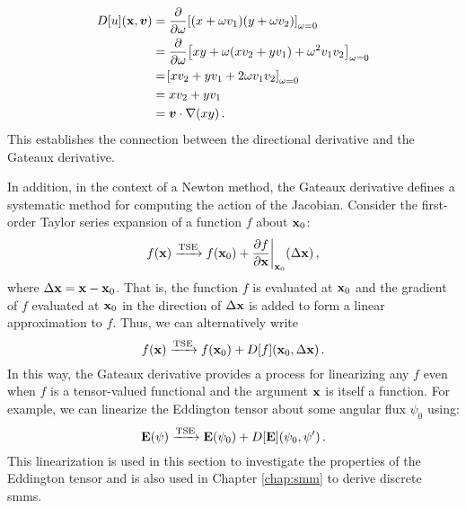 \documentclass[../doc.tex]{subfiles}
\begin{document}
	\begin{equation}
	\begin{aligned}
		D[u](\boldsymbol{\mathrm{x}},\boldsymbol{v}) &= \frac{\partial }{\partial \omega}\!\left[ (x+\omega v_1)(y + \omega v_2) \right]_{\omega = 0} \\
		&= \frac{\partial }{\partial \omega}\!\left[ xy + \omega(xv_2 + yv_1) + \omega^2 v_1 v_2 \right]_{\omega = 0} \\
		&= \!\left[ xv_2 + yv_1 + 2\omega v_1 v_2 \right]_{\omega = 0} \\
		&= x v_2 + y v_1 \\ 
		&= \boldsymbol{v} \cdot \nabla (xy) \,. 
	\end{aligned}
	\end{equation}
This establishes the connection between the directional derivative and the Gateaux derivative. 

In addition, in the context of a Newton method, the Gateaux derivative defines a systematic method for computing the action of the Jacobian. Consider the first-order Taylor series expansion of a function $f$ about $\boldsymbol{\mathrm{x}}_0$: 
	\begin{equation}
		f(\boldsymbol{\mathrm{x}}) \xrightarrow{\text{TSE}} f(\boldsymbol{\mathrm{x}}_0) + \frac{\partial f}{\partial \boldsymbol{\mathrm{x}}}\biggr\rvert_{\boldsymbol{\mathrm{x}}_0}(\Delta \boldsymbol{\mathrm{x}}) \,,
	\end{equation}
where $\Delta \boldsymbol{\mathrm{x}} = \boldsymbol{\mathrm{x}} - \boldsymbol{\mathrm{x}}_0$. That is, the function $f$ is evaluated at $\boldsymbol{\mathrm{x}}_0$ and the gradient of $f$ evaluated at $\boldsymbol{\mathrm{x}}_0$ in the direction of $\Delta\boldsymbol{\mathrm{x}}$ is added to form a linear approximation to $f$. Thus, we can alternatively write 
	\begin{equation}
		f(\boldsymbol{\mathrm{x}}) \xrightarrow{\text{TSE}} f(\boldsymbol{\mathrm{x}}_0) + D[f](\boldsymbol{\mathrm{x}}_0, \Delta \boldsymbol{\mathrm{x}}) \,. 
	\end{equation}
In this way, the Gateaux derivative provides a process for linearizing any $f$ even when $f$ is a tensor-valued functional and the argument $\boldsymbol{\mathrm{x}}$ is itself a function. For example, we can linearize the Eddington tensor about some angular flux $\psi_0$ using: 
	\begin{equation}
		\boldsymbol{\mathrm{E}}(\psi) \xrightarrow{\text{TSE}} \boldsymbol{\mathrm{E}}(\psi_0) + D[\boldsymbol{\mathrm{E}}](\psi_0,\psi') \,. 
	\end{equation}
This linearization is used in this section to investigate the properties of the Eddington tensor and is also used in Chapter \ref{chap:smm} to derive discrete \glspl{smm}. 
\end{document}
